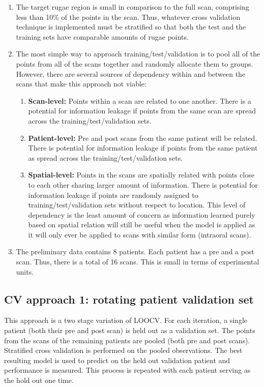 \documentclass[11pt]{article}
\theoremstyle{definition}
\begin{document}
\begin{enumerate}
    \item The target rugae region is small in comparison to the full scan, comprising less than 10\% of the points in the scan. Thus, whatever cross validation technique is implemented must be stratified so that both the test and the training sets have comparable amounts of rugae points.
    \item The most simple way to approach training/test/validation is to pool all of the points from all of the scans together and randomly allocate them to groups. However, there are several sources of dependency within and between the scans that make this approach not viable:
    \begin{enumerate}
        \item \textbf{Scan-level:} Points within a scan are related to one another. There is a potential for information leakage if points from the same scan are spread across the training/test/validation sets.
        \item \textbf{Patient-level:} Pre and post scans from the same patient will be related. There is potential for information leakage if points from the same patient as spread across the training/test/validation sets.
        \item \textbf{Spatial-level:} Points in the scans are spatially related with points close to each other sharing larger amount of information. There is potential for information leakage if points are randomly assigned to training/test/validation sets without respect to location. This level of dependency is the least amount of concern as information learned purely based on spatial relation will still be useful when the model is applied as it will only ever be applied to scans with similar form (intraoral scans).
    \end{enumerate}
    \item The preliminary data contains 8 patients. Each patient has a pre and a post scan. Thus, there is a total of 16 scans. This is small in terms of experimental units. 
\end{enumerate}

\subsection{CV approach 1: rotating patient validation set}

This approach is a two stage variation of LOOCV. For each iteration, a single patient (both their pre and post scan) is held out as a validation set. The points from the scans of the remaining patients are pooled (both pre and post scans). Stratified cross validation is performed on the pooled observations. The best resulting model is used to predict on the held out validation patient and performance is measured. This process is repeated with each patient serving as the hold out one time. 
\end{document}
